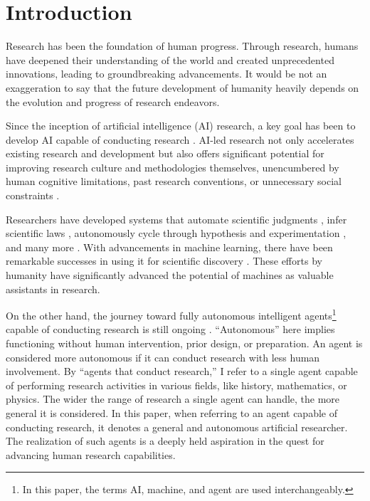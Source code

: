 \section{Introduction}
Research has been the foundation of human progress. Through research, humans have deepened their understanding of the world and created unprecedented innovations, leading to groundbreaking advancements. It would be not an exaggeration to say that the future development of humanity heavily depends on the evolution and progress of research endeavors.

Since the inception of artificial intelligence (AI) research, a key goal has been to develop AI capable of conducting research \cite{zenil2023future}. AI-led research not only accelerates existing research and development but also offers significant potential for improving research culture and methodologies themselves, unencumbered by human cognitive limitations, past research conventions, or unnecessary social constraints \cite{zenil2023future,kitano2021nobel}.

Researchers have developed systems that automate scientific judgments \cite{lindsay1993dendral}, infer scientific laws \cite{langley1987scientific}, autonomously cycle through hypothesis and experimentation \cite{king2004functional}, and many more \cite{zenil2023future,zenil2023}. With advancements in machine learning, there have been remarkable successes in using it for scientific discovery \cite{wang2023scientific,xu2021artificial,zhang2023artificial,ai4science2023impact}. These efforts by humanity have significantly advanced the potential of machines as valuable assistants in research.

On the other hand, the journey toward fully autonomous intelligent agents\footnote{
In this paper, the terms AI, machine, and agent are used interchangeably.
} capable of conducting research is still ongoing \cite{zenil2023future,coley2020autonomousII}. ``Autonomous'' here implies functioning without human intervention, prior design, or preparation. An agent is considered more autonomous if it can conduct research with less human involvement. By ``agents that conduct research,'' I refer to a single agent capable of performing research activities in various fields, like history, mathematics, or physics. The wider the range of research a single agent can handle, the more general it is considered. In this paper, when referring to an agent capable of conducting research, it denotes a general and autonomous artificial researcher. The realization of such agents is a deeply held aspiration in the quest for advancing human research capabilities.

